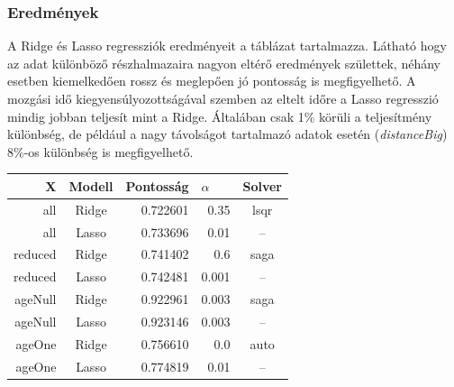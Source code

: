 \subsubsection{Eredmények}
A Ridge és Lasso regressziók eredményeit a  táblázat tartalmazza. Látható hogy az adat különböző részhalmazaira nagyon eltérő eredmények születtek, néhány esetben kiemelkedően rossz és meglepően jó pontosság is megfigyelhető. A mozgási idő kiegyensúlyozottságával szemben az eltelt időre a Lasso regresszió mindig jobban teljesít mint a Ridge. Általában csak 1\% körüli a teljesítmény különbség, de például a nagy távolságot tartalmazó adatok esetén (\textit{distanceBig}) 8\%-os különbség is megfigyelhető.
\begin{table}[h!]
	\centering
	\begin{tabular}{|r|c|r|r|c|}
		\hline
		\textbf{X}    & \textbf{Modell} & \multicolumn{1}{l|}{\textbf{Pontosság}} & \multicolumn{1}{l|}{\textbf{$\alpha$}} & \textbf{Solver} \\ \hline
		all           & Ridge           & 0.722601                                & 0.35                                   & lsqr            \\ \hline
		all           & Lasso           & 0.733696                                & 0.01                                   & --              \\ \hline
		reduced       & Ridge           & 0.741402                                & 0.6                                    & saga            \\ \hline
		reduced       & Lasso           & 0.742481                                & 0.001                                  & --              \\ \hline
		ageNull       & Ridge           & 0.922961                                & 0.003                                  & saga            \\ \hline
		ageNull       & Lasso           & 0.923146                                & 0.003                                  & --              \\ \hline
		ageOne        & Ridge           & 0.756610                                & 0.0                                    & auto            \\ \hline
		ageOne        & Lasso           & 0.774819                                & 0.01                                   & --              \\ \hline

\end{tabular}
\end{table}

